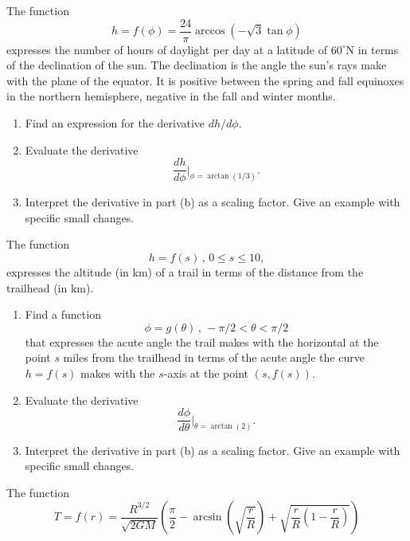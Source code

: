 \documentclass{ximera}
\begin{document}
\begin{question} \label{Wpfee}
The function
\[ 
 h = f(\phi) = \frac{24}{\pi} \arccos \left(-\sqrt{3}\tan\phi   \right)
\]
expresses the number of hours of daylight per day at a latitude of $60^\circ$N in terms of the declination of the sun. The declination is the angle the sun’s rays make with the plane of the equator. It is positive between the spring and fall equinoxes in the northern hemisphere, negative in the fall and winter months.  

\begin{enumerate}
\item Find an expression for the derivative $dh/d\phi$.

\item Evaluate the derivative
\[
     \frac{dh}{d\phi}\Big|_{\phi = \arctan(1/3)} .
\]

\item Interpret the derivative in part (b) as a scaling factor. Give an example with specific small changes.  
\end{enumerate}
\end{question}


\begin{question} \label{Qdefefr}
The function
\[
 h = f(s) \, , \, 0\leq s \leq 10,
\]
expresses the altitude (in km) of a trail in terms of the distance from the trailhead (in km).

\begin{enumerate}
\item Find a function
\[
  \phi = g(\theta) \, , \, -\pi/2 <  \theta < \pi/2
\]
that expresses the acute angle the trail makes with the horizontal at the point $s$ miles from the trailhead in terms of the acute angle the curve $h=f(s)$ makes with the $s$-axis at the point $(s,f(s))$. 

\item Evaluate the derivative
\[
\frac{d\phi}{d\theta}\Big|_{\theta = \arctan(2)} .
\]
\item Interpret the derivative in part (b) as a scaling factor. Give an example with specific small changes.  
\end{enumerate}
\end{question}



\begin{question} \label{Qpdfe9930}
The function
\[
      T = f(r) = \frac{R^{3/2}}{\sqrt{2GM}} \left( \frac{\pi}{2} - \arcsin\left( \sqrt{\frac{r}{R}} \right) + \sqrt{\frac{r}{R}\left(1 - \frac{r}{R} \right)}    \right)
\]

\end{question}
\end{document}
